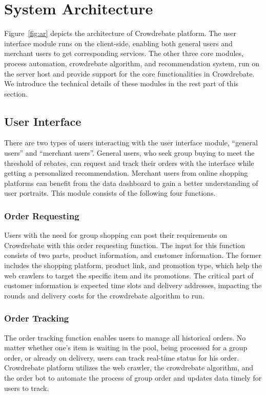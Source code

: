\section{System Architecture}

Figure~\ref{fig:ar} depicts the architecture of Crowdrebate platform. The user interface module runs on the client-side, enabling both general users and merchant users to get corresponding services. The other three core modules, process automation, crowdrebate algorithm, and recommendation system, run on the server host and provide support for the core functionalities in Crowdrebate. We introduce the technical details of these modules in the rest part of this section.

\subsection{User Interface}

There are two types of users interacting with the user interface module, ``general users'' and ``merchant users''. General users, who seek group buying to meet the threshold of rebates, can request and track their orders with the interface while getting a personalized recommendation. Merchant users from online shopping platforms can benefit from the data dashboard to gain a better understanding of user portraits. This module consists of the following four functions.

\subsubsection{Order Requesting}

Users with the need for group shopping can post their requirements on Crowdrebate with this order requesting function. The input for this function consists of two parts, product information, and customer information. The former includes the shopping platform, product link, and promotion type, which help the web crawlers to target the specific item and its promotions. The critical part of customer information is expected time slots and delivery addresses, impacting the rounds and delivery costs for the crowdrebate algorithm to run.

\subsubsection{Order Tracking}

The order tracking function enables users to manage all historical orders. No matter whether one's item is waiting in the pool, being processed for a group order, or already on delivery, users can track real-time status for his order. Crowdrebate platform utilizes the web crawler, the crowdrebate algorithm, and the order bot to automate the process of group order and updates data timely for users to track.
	
